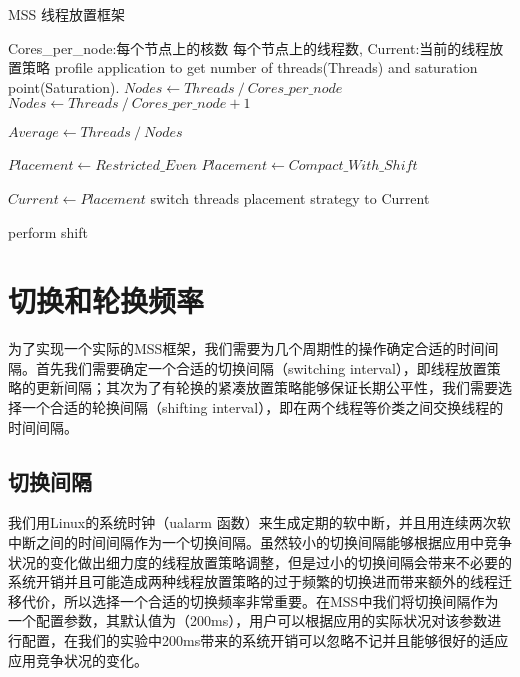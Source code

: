 \begin{algorithm}
\caption{MSS 线程放置框架}
\label{algo:mss}
\begin{algorithmic}[1] %
\Require Cores\_per\_node:每个节点上的核数 每个节点上的线程数, Current:当前的线程放置策略 %
\Repeat
{}
\State profile application to get number of threads(Threads) and saturation point(Saturation).
    \State $Nodes \gets Threads\  / \ Cores\_per\_node$
\Else
    \State $Nodes \gets Threads\  / \ Cores\_per\_node + 1$
\EndIf

\State $Average \gets Threads\  / \ Nodes$

    \State $Placement \gets Restricted\_Even$
\Else
    \State $Placement \gets Compact\_With\_Shift$
\EndIf

    \State $Current \gets Placement$
    \State switch threads placement strategy to Current 
\EndIf

    \State perform shift
\EndIf

\end{algorithmic}
\end{algorithm}

\section{切换和轮换频率}
为了实现一个实际的MSS框架，我们需要为几个周期性的操作确定合适的时间间隔。首先我们需要确定一个合适的切换间隔（switching interval），即线程放置策略的更新间隔；其次为了有轮换的紧凑放置策略能够保证长期公平性，我们需要选择一个合适的轮换间隔（shifting interval），即在两个线程等价类之间交换线程的时间间隔。

\subsection{切换间隔}
我们用Linux的系统时钟（ualarm 函数）来生成定期的软中断，并且用连续两次软中断之间的时间间隔作为一个切换间隔。虽然较小的切换间隔能够根据应用中竞争状况的变化做出细力度的线程放置策略调整，但是过小的切换间隔会带来不必要的系统开销并且可能造成两种线程放置策略的过于频繁的切换进而带来额外的线程迁移代价，所以选择一个合适的切换频率非常重要。在MSS中我们将切换间隔作为一个配置参数，其默认值为（200ms），用户可以根据应用的实际状况对该参数进行配置，在我们的实验中200ms带来的系统开销可以忽略不记并且能够很好的适应应用竞争状况的变化。

